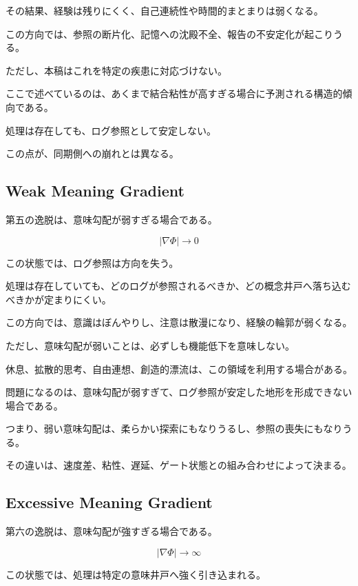 その結果、経験は残りにくく、自己連続性や時間的まとまりは弱くなる。

この方向では、参照の断片化、記憶への沈殿不全、報告の不安定化が起こりうる。

ただし、本稿はこれを特定の疾患に対応づけない。

ここで述べているのは、あくまで結合粘性が高すぎる場合に予測される構造的傾向である。

処理は存在しても、ログ参照として安定しない。

この点が、同期側への崩れとは異なる。

\subsection{Weak Meaning Gradient}

第五の逸脱は、意味勾配が弱すぎる場合である。

\begin{equation}
|\nabla \Phi| \rightarrow 0
\end{equation}

この状態では、ログ参照は方向を失う。

処理は存在していても、どのログが参照されるべきか、どの概念井戸へ落ち込むべきかが定まりにくい。

この方向では、意識はぼんやりし、注意は散漫になり、経験の輪郭が弱くなる。

ただし、意味勾配が弱いことは、必ずしも機能低下を意味しない。

休息、拡散的思考、自由連想、創造的漂流は、この領域を利用する場合がある。

問題になるのは、意味勾配が弱すぎて、ログ参照が安定した地形を形成できない場合である。

つまり、弱い意味勾配は、柔らかい探索にもなりうるし、参照の喪失にもなりうる。

その違いは、速度差、粘性、遅延、ゲート状態との組み合わせによって決まる。

\subsection{Excessive Meaning Gradient}

第六の逸脱は、意味勾配が強すぎる場合である。

\begin{equation}
|\nabla \Phi| \rightarrow \infty
\end{equation}

この状態では、処理は特定の意味井戸へ強く引き込まれる。


